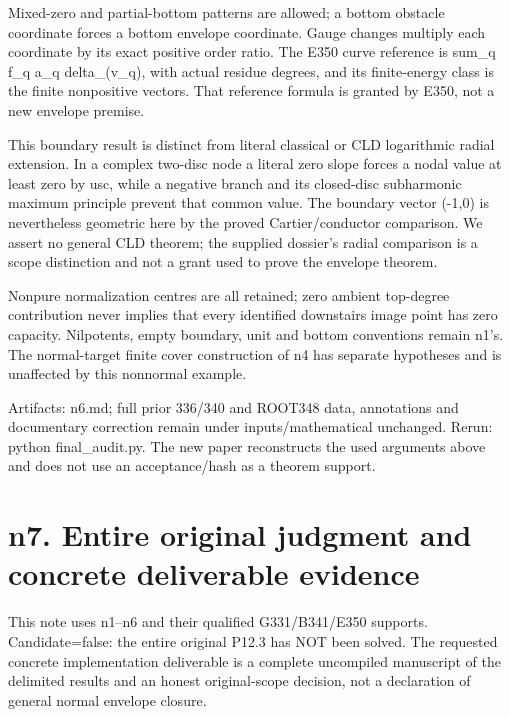 \documentclass[11pt]{article}
\begin{document}
Mixed-zero and partial-bottom patterns are allowed; a bottom obstacle coordinate forces a bottom envelope coordinate. Gauge changes multiply each coordinate by its exact positive order ratio. The E350 curve reference is sum\_q f\_q a\_q delta\_(v\_q), with actual residue degrees, and its finite-energy class is the finite nonpositive vectors. That reference formula is granted by E350, not a new envelope premise.

This boundary result is distinct from literal classical or CLD logarithmic radial extension. In a complex two-disc node a literal zero slope forces a nodal value at least zero by usc, while a negative branch and its closed-disc subharmonic maximum principle prevent that common value. The boundary vector (-1,0) is nevertheless geometric here by the proved Cartier/conductor comparison. We assert no general CLD theorem; the supplied dossier's radial comparison is a scope distinction and not a grant used to prove the envelope theorem.

Nonpure normalization centres are all retained; zero ambient top-degree contribution never implies that every identified downstairs image point has zero capacity. Nilpotents, empty boundary, unit and bottom conventions remain n1's. The normal-target finite cover construction of n4 has separate hypotheses and is unaffected by this nonnormal example.

Artifacts: n6.md; full prior 336/340 and ROOT348 data, annotations and documentary correction remain under inputs/mathematical unchanged. Rerun: python final\_audit.py. The new paper reconstructs the used arguments above and does not use an acceptance/hash as a theorem support.

\section{n7. Entire original judgment and concrete deliverable evidence}

This note uses n1--n6 and their qualified G331/B341/E350 supports. Candidate=false: the entire original P12.3 has NOT been solved. The requested concrete implementation deliverable is a complete uncompiled manuscript of the delimited results and an honest original-scope decision, not a declaration of general normal envelope closure.
\end{document}
